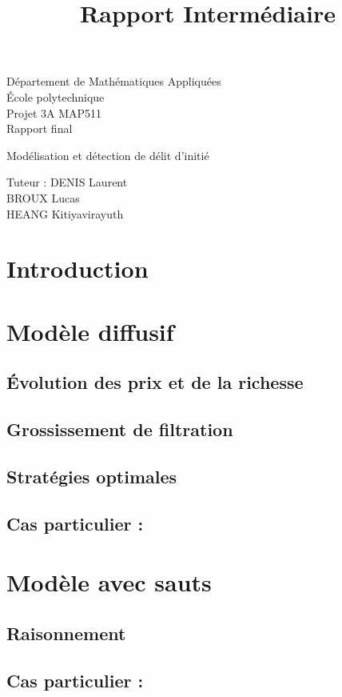 \documentclass[11pt,letterpaper]{article}
\title{Rapport Intermédiaire}
\begin{document}

\vspace{1.5cm}
\begin{center}
\huge{Département de Mathématiques Appliquées\\École polytechnique \\}
\vspace{1.5cm}
\LARGE{Projet 3A MAP511}\\
\vspace{0.3cm}
\LARGE{Rapport final}
\end{center}

\vspace{1.5cm}
\begin{center}
\Huge{Modélisation et détection de délit d'initié}
\end{center}
\vspace{1.5cm}

\begin{center}
\LARGE{Tuteur : DENIS Laurent}\\
\vspace{0.5cm}
\LARGE{BROUX Lucas}\\
\LARGE{HEANG Kitiyavirayuth}
\end{center}

\pagebreak
\tableofcontents
\pagebreak

\section{Introduction}



\pagebreak
\section{Modèle diffusif}
%
\subsection{Évolution des prix et de la richesse}

\subsection{Grossissement de filtration}
\subsection{Stratégies optimales}
\subsection{Cas particulier : }


\pagebreak
\section{Modèle avec sauts}
\subsection{Raisonnement}

\subsection{Cas particulier : }


\pagebreak
\nocite{*}


\end{document}
